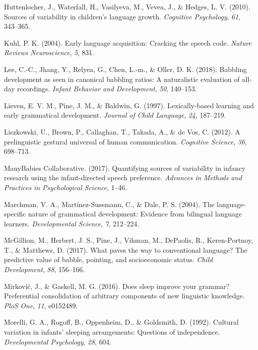 \documentclass[floatsintext,man]{apa6}
\theoremstyle{definition}
\theoremstyle{definition}
\theoremstyle{definition}
\theoremstyle{remark}
\begin{document}
\hypertarget{ref-huttenlocher2010sources}{}
Huttenlocher, J., Waterfall, H., Vasilyeva, M., Vevea, J., \& Hedges, L.
V. (2010). Sources of variability in children's language growth.
\emph{Cognitive Psychology}, \emph{61}, 343--365.

\hypertarget{ref-kuhl2004early}{}
Kuhl, P. K. (2004). Early language acquisition: Cracking the speech
code. \emph{Nature Reviews Neuroscience}, \emph{5}, 831.

\hypertarget{ref-lee2018babbling}{}
Lee, C.-C., Jhang, Y., Relyea, G., Chen, L.-m., \& Oller, D. K. (2018).
Babbling development as seen in canonical babbling ratios: A
naturalistic evaluation of all-day recordings. \emph{Infant Behavior and
Development}, \emph{50}, 140--153.

\hypertarget{ref-lieven1997lexically}{}
Lieven, E. V. M., Pine, J. M., \& Baldwin, G. (1997). Lexically-based
learning and early grammatical development. \emph{Journal of Child
Language}, \emph{24}, 187--219.

\hypertarget{ref-liszkowski2012prelinguistic}{}
Liszkowski, U., Brown, P., Callaghan, T., Takada, A., \& de Vos, C.
(2012). A prelinguistic gestural universal of human communication.
\emph{Cognitive Science}, \emph{36}, 698--713.

\hypertarget{ref-manybabies2017}{}
ManyBabies Collaborative. (2017). Quantifying sources of variability in
infancy research using the infant-directed speech preference.
\emph{Advances in Methods and Practices in Psychological Science},
1--46.

\hypertarget{ref-marchman2004language}{}
Marchman, V. A., Martínez-Sussmann, C., \& Dale, P. S. (2004). The
language-specific nature of grammatical development: Evidence from
bilingual language learners. \emph{Developmental Science}, \emph{7},
212--224.

\hypertarget{ref-mcgillion2017paves}{}
McGillion, M., Herbert, J. S., Pine, J., Vihman, M., DePaolis, R.,
Keren-Portnoy, T., \& Matthews, D. (2017). What paves the way to
conventional language? The predictive value of babble, pointing, and
socioeconomic status. \emph{Child Development}, \emph{88}, 156--166.

\hypertarget{ref-mirkovic2016does}{}
Mirković, J., \& Gaskell, M. G. (2016). Does sleep improve your grammar?
Preferential consolidation of arbitrary components of new linguistic
knowledge. \emph{PloS One}, \emph{11}, e0152489.

\hypertarget{ref-morelli1992cultural}{}
Morelli, G. A., Rogoff, B., Oppenheim, D., \& Goldsmith, D. (1992).
Cultural variation in infants' sleeping arrangements: Questions of
independence. \emph{Developmental Psychology}, \emph{28}, 604.
\end{document}
